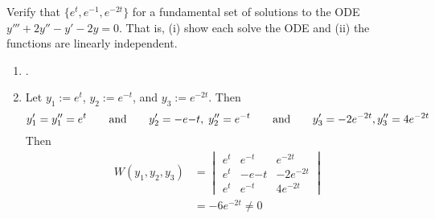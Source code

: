 Verify that $\{e^t, e^{-1}, e^{-2t}\}$ for a fundamental set of solutions to the ODE $y''' + 2y'' - y' - 2y = 0$. That is, (i) show each solve the ODE and (ii) the functions are linearly independent.



\begin{enumerate}[label=(\roman*)]
    \item .
    \item Let $y_1 := e^t$, $y_2 := e^{-t}$, and $y_3 := e^{-2t}$. Then
    $$y_1' = y_1'' = e^t \qquad \text{and} \qquad y_2' = -e{-t}, \; y_2'' = e^{-t} \qquad \text{and} \qquad y_3' = -2e^{-2t}, y_3'' = 4e^{-2t}$$ Then \begin{align*}
        W(y_1, y_2, y_3) &= {\begin{vmatrix}
            e^t & e^{-t} & e^{-2t} \\
            e^t & -e{-t} & -2e^{-2t} \\
            e^t & e^{-t} & 4e^{-2t}
        \end{vmatrix}}\\
        &= -6e^{-2t} \neq 0
    \end{align*}
\end{enumerate}